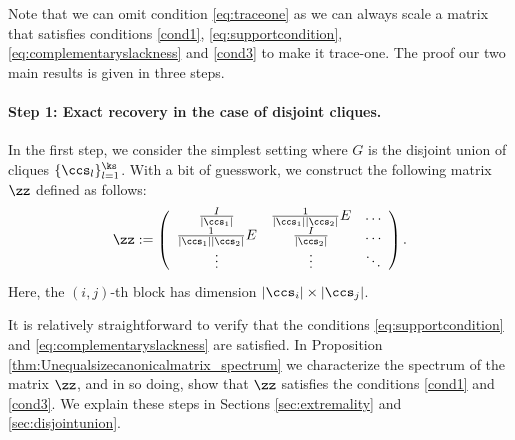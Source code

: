 
Note that we can omit condition \eqref{eq:traceone} as we can always scale a matrix that satisfies conditions \eqref{cond1}, \eqref{eq:supportcondition},  \eqref{eq:complementaryslackness} and  \eqref{cond3} to make  it trace-one.  The proof our two main results   is given in three steps.

\paragraph{Step 1: Exact recovery in the case of disjoint cliques.}  In the first step, we consider the simplest setting where $G$ is the disjoint union of cliques $\{\ccs_l\}_{l=1}^{\ks}$.  With a bit of guesswork, we construct the following matrix $\zz$ defined as follows:
\begin{equation}\label{zmatrix}
\zz := \left(\begin{array}{ccc}
\frac{I}{|\ccs_1|} & \frac{1}{|\ccs_1||\ccs_2|} E & \ldots \\
\frac{1}{|\ccs_1||\ccs_2|} E & \frac{I}{|\ccs_2|} & \ldots \\
\vdots & \vdots & \ddots
 \end{array}\right).
\end{equation}
Here, the $(i,j)$-th block has dimension $|\ccs_i| \times |\ccs_j|$.

It is relatively straightforward to verify that the conditions \eqref{eq:supportcondition} and \eqref{eq:complementaryslackness} are satisfied.  In  Proposition \ref{thm:Unequalsizecanonicalmatrix_spectrum} we characterize the spectrum of the matrix $\zz$, and in so doing, show that $\zz$ satisfies the conditions \eqref{cond1} and \eqref{cond3}.  We explain these steps in Sections \ref{sec:extremality} and \ref{sec:disjointunion}.

